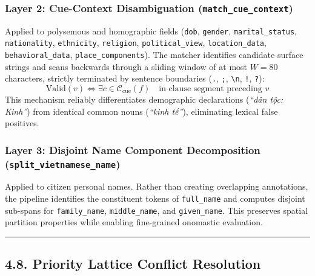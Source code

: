 \documentclass[
]{article}
\begin{document}
\subsubsection{\texorpdfstring{Layer 2: Cue-Context Disambiguation
(\texttt{match\_cue\_context})}{Layer 2: Cue-Context Disambiguation (match\_cue\_context)}}\label{layer-2-cue-context-disambiguation-match_cue_context}

Applied to polysemous and homographic fields (\texttt{dob},
\texttt{gender}, \texttt{marital\_status}, \texttt{nationality},
\texttt{ethnicity}, \texttt{religion}, \texttt{political\_view},
\texttt{location\_data}, \texttt{behavioral\_data},
\texttt{place\_components}). The matcher identifies candidate surface
strings and scans backwards through a sliding window of at most
\(W = 80\) characters, strictly terminated by sentence boundaries
(\texttt{.}, \texttt{;}, \texttt{\textbackslash{}n}, \texttt{!},
\texttt{?}):
\[\text{Valid}(v) \Longleftrightarrow \exists c \in \mathcal{C}_{\text{cue}}(f) \quad \text{in clause segment preceding } v\]
This mechanism reliably differentiates demographic declarations
(\emph{``dân tộc: Kinh''}) from identical common nouns (\emph{``kinh
tế''}), eliminating lexical false positives.

\subsubsection{\texorpdfstring{Layer 3: Disjoint Name Component
Decomposition
(\texttt{split\_vietnamese\_name})}{Layer 3: Disjoint Name Component Decomposition (split\_vietnamese\_name)}}\label{layer-3-disjoint-name-component-decomposition-split_vietnamese_name}

Applied to citizen personal names. Rather than creating overlapping
annotations, the pipeline identifies the constituent tokens of
\texttt{full\_name} and computes disjoint sub-spans for
\texttt{family\_name}, \texttt{middle\_name}, and \texttt{given\_name}.
This preserves spatial partition properties while enabling fine-grained
onomastic evaluation.

\begin{center}\rule{0.5\linewidth}{0.5pt}\end{center}

\subsection{4.8. Priority Lattice Conflict
Resolution}\label{priority-lattice-conflict-resolution}
\end{document}
